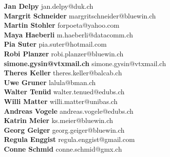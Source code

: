 \documentclass{scrartcl}
\begin{document}
\textbf{Jan Delpy } jan.delpy@duk.ch\\
\textbf{Margrit Schneider } margritschneider@bluewin.ch\\
\textbf{Martin Stohler } forpoeta@yahoo.com\\
\textbf{Maya Haeberli } m.haeberli@datacomm.ch\\
\textbf{Pia Suter } pia.suter@hotmail.com\\
\textbf{Robi Planzer } robi.planzer@bluewin.ch\\
\textbf{simone.gysin@vtxmail.ch } simone.gysin@vtxmail.ch\\
\textbf{Theres Keller } theres.keller@balcab.ch\\
\textbf{Uwe Gruner } lalula@bman.ch\\
\textbf{Walter Tenüd } walter.tenued@edubs.ch\\
\textbf{Willi Matter } willi.matter@unibas.ch\\
\textbf{Andreas Vogele } andreas.vogele@edubs.ch\\
\textbf{Katrin Meier } ks.meier@bluewin.ch\\
\textbf{Georg Geiger } georg.geiger@bluewin.ch\\
\textbf{Regula Enggist } regula.enggist@gmail.com\\
\textbf{Conne Schmid } conne.schmid@gmx.ch\\
\end{document}
